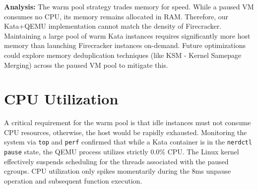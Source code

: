 \textbf{Analysis:} The warm pool strategy trades memory for speed. While a paused VM consumes no CPU, its memory remains allocated in RAM. Therefore, our Kata+QEMU implementation cannot match the density of Firecracker. Maintaining a large pool of warm Kata instances requires significantly more host memory than launching Firecracker instances on-demand. Future optimizations could explore memory deduplication techniques (like KSM - Kernel Samepage Merging) across the paused VM pool to mitigate this.

\section{CPU Utilization}
A critical requirement for the warm pool is that idle instances must not consume CPU resources, otherwise, the host would be rapidly exhausted.
Monitoring the system via \texttt{top} and \texttt{perf} confirmed that while a Kata container is in the \texttt{nerdctl pause} state, the QEMU process utilizes strictly 0.0\% CPU. The Linux kernel effectively suspends scheduling for the threads associated with the paused cgroups. CPU utilization only spikes momentarily during the 8ms unpause operation and subsequent function execution.

\vspace{1cm}
\lipsum[61-80] %
